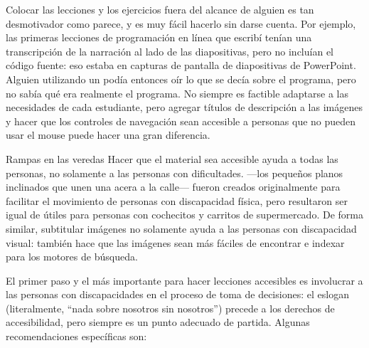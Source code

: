 
Colocar las lecciones y los ejercicios fuera del alcance de alguien es tan desmotivador como parece,
y es muy fácil hacerlo sin darse cuenta.
Por ejemplo,
las primeras lecciones de programación en línea que escribí tenían una transcripción de la narración
al lado de las diapositivas,
pero no incluían el código fuente:
eso estaba en capturas de pantalla de diapositivas de PowerPoint.
Alguien utilizando un 
podía entonces oír lo que se decía sobre el programa,
pero no sabía qué era realmente el programa.
No siempre es factible adaptarse a las necesidades de cada estudiante,
pero agregar títulos de descripción a las imágenes
y hacer que los controles de navegación sean accesible a personas que no pueden usar el mouse
puede hacer una gran diferencia.

\begin{aside}{Rampas en las veredas}
  Hacer que el material sea accesible ayuda a todas las personas,
  no solamente a las personas con dificultades.
---los pequeños planos inclinados que unen una acera a la calle---
  fueron creados originalmente para facilitar el movimiento de personas con discapacidad física,
  pero resultaron ser igual de útiles para personas con cochecitos y carritos de supermercado.
  De forma similar,
  subtitular imágenes no solamente ayuda a las personas con discapacidad visual:
  también hace que las imágenes sean más fáciles de encontrar e indexar para los motores de búsqueda.
\end{aside}

El primer paso y el más importante para hacer lecciones accesibles es
involucrar a las personas con discapacidades en el proceso de toma de decisiones:
el eslogan \emph{}
(literalmente, ``nada sobre nosotros sin nosotros'')
precede a los derechos de accesibilidad,
pero siempre es un punto adecuado de partida.
Algunas recomendaciones específicas son:

